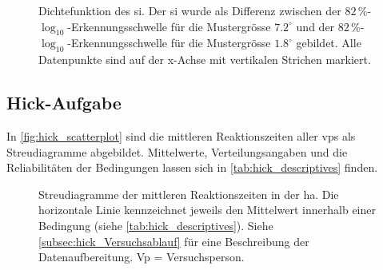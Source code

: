 \documentclass[11pt, twoside, a4paper]{book}		%
\begin{document}
\begin{figure}[htbp]
	\centering
	\begin{adjustbox}{width=1\textwidth}
		
	\end{adjustbox}
	\caption[Dichtefunktion des \gls{si}]{Dichtefunktion des \gls{si}. Der \gls{si} wurde als Differenz zwischen der $82\,\%$-$\log_{10}$-Er\-ken\-nungs\-schwel\-le für die Mustergrösse $7.2^{\circ}$ und der $82\,\%$-$\log_{10}$-Er\-ken\-nungs\-schwel\-le für die Mustergrösse $1.8^{\circ}$ gebildet. Alle Datenpunkte sind auf der x-Achse mit vertikalen Strichen markiert.}
	\label{fig:suppression_index_density}
\end{figure}

\subsection{Hick-Aufgabe}

In \autoref{fig:hick_scatterplot} sind die mittleren Reaktionszeiten aller \glspl{vp} als Streudiagramme abgebildet.
Mittelwerte, Verteilungsangaben und die Reliabilitäten der Bedingungen lassen sich in \autoref{tab:hick_descriptives} finden. 

\begin{figure}[p]
	\centering
	\begin{adjustbox}{width=1\textwidth}
		
	\end{adjustbox}
	\caption[Streudiagramm der \gls{ha}]{Streudiagramme der mittleren Reaktionszeiten in der \gls{ha}. Die horizontale Linie kennzeichnet jeweils den Mittelwert innerhalb einer Bedingung (siehe \autoref{tab:hick_descriptives}). Siehe \autoref{subsec:hick_Versuchsablauf} für eine Beschreibung der Datenaufbereitung. Vp = Versuchsperson.}
	\label{fig:hick_scatterplot}
\end{figure}
\end{document}
